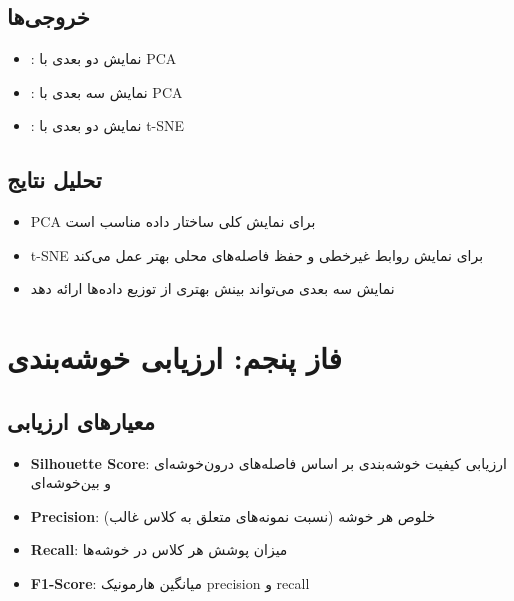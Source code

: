 \documentclass[a4paper,12pt]{article}
\let\nobreaksection\section
\renewcommand{\section}{\nobreaksection}  %
\begin{document}
	\subsection{خروجی‌ها}
	\begin{itemize}
		\item {}: نمایش دو بعدی با PCA
		\item {}: نمایش سه بعدی با PCA
		\item {}: نمایش دو بعدی با t-SNE
	\end{itemize}
	
	\subsection{تحلیل نتایج}
	\begin{itemize}
		\item PCA برای نمایش کلی ساختار داده مناسب است
		\item t-SNE برای نمایش روابط غیرخطی و حفظ فاصله‌های محلی بهتر عمل می‌کند
		\item نمایش سه بعدی می‌تواند بینش بهتری از توزیع داده‌ها ارائه دهد
	\end{itemize}
	
	
	\section{فاز پنجم: ارزیابی خوشه‌بندی}
	
	\subsection{معیارهای ارزیابی}
	\begin{itemize}
		\item \textbf{Silhouette Score}: ارزیابی کیفیت خوشه‌بندی بر اساس فاصله‌های درون‌خوشه‌ای و بین‌خوشه‌ای
		\item \textbf{Precision}: خلوص هر خوشه (نسبت نمونه‌های متعلق به کلاس غالب)
		\item \textbf{Recall}: میزان پوشش هر کلاس در خوشه‌ها
		\item \textbf{F1-Score}: میانگین هارمونیک precision و recall
	\end{itemize}
	
\end{document}
